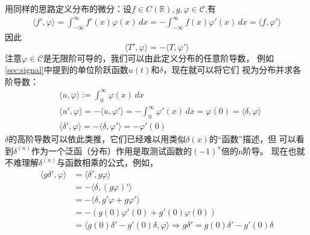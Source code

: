 \documentclass{ctexbook}
\begin{document}
用同样的思路定义分布的微分：设$f\in C(\mathbb{R}),g,\varphi\in\mathcal{C} $,有
\begin{align*}
    \langle f',\varphi\rangle=\int_{-\infty}^{\infty}f'(x)\varphi(x)\,dx=-\int_{-\infty}^{\infty}f(x)\varphi'(x)\,dx=\langle f,\varphi'\rangle
\end{align*}
因此
\begin{equation}
    \langle T',\varphi\rangle=-\langle T,\varphi'\rangle
\end{equation}
注意$\varphi\in\mathcal{C} $是无限阶可导的，我们可以由此定义分布的任意阶导数，
例如\ref{sec:signal}中提到的单位阶跃函数$u(t)$和$\delta$，现在就可以将它们
视为分布并求各阶导数：
\begin{align*}
     & \langle u,\varphi\rangle:=\int_{0}^{\infty}\varphi(x)\,dx                                                                      \\
     & \langle u',\varphi\rangle=-\langle u,\varphi'\rangle=-\int_{0}^{\infty}\varphi'(x)\,dx=\varphi(0)=\langle\delta,\varphi\rangle \\
     & \langle \delta',\varphi\rangle=-\langle \delta,\varphi'\rangle=-\varphi'(0)
\end{align*}
$\delta$的高阶导数可以依此类推，它们已经难以用类似$\delta(x)$的“函数”描述，但
可以看到$\delta^{(n)}$作为一个泛函（分布）作用是取测试函数的$(-1)^n$倍的n阶导。
现在也就不难理解$\delta^{(n)}$与函数相乘的公式，例如，
\begin{align*}
    \langle g\delta',\varphi\rangle & =\langle \delta',g\varphi\rangle                \\
                                    & =-\langle\delta,(g\varphi)'\rangle              \\
                                    & =-\langle\delta,g'\varphi+g\varphi'\rangle      \\
                                    & =-(g(0)\varphi'(0)+g'(0)\varphi(0))             \\
                                    & =\langle g(0)\delta'-g'(0)\delta,\varphi\rangle
    \Rightarrow g\delta'=g(0)\delta'-g'(0)\delta
\end{align*}
\end{document}
